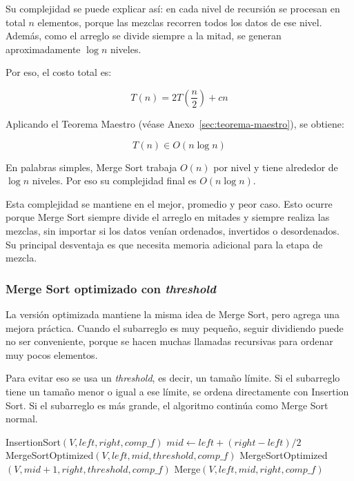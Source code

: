 Su complejidad se puede explicar así: en cada nivel de recursión se procesan en total $n$ elementos, porque las mezclas recorren todos los datos de ese nivel. Además, como el arreglo se divide siempre a la mitad, se generan aproximadamente $\log n$ niveles.

Por eso, el costo total es:

\[
    T(n)=2T\left(\frac{n}{2}\right)+cn
\]

Aplicando el Teorema Maestro (véase Anexo~\ref{sec:teorema-maestro}), se obtiene:

\[
    T(n) \in O(n \log n)
\]

En palabras simples, Merge Sort trabaja $O(n)$ por nivel y tiene alrededor de $\log n$ niveles. Por eso su complejidad final es $O(n \log n)$.

Esta complejidad se mantiene en el mejor, promedio y peor caso. Esto ocurre porque Merge Sort siempre divide el arreglo en mitades y siempre realiza las mezclas, sin importar si los datos venían ordenados, invertidos o desordenados. Su principal desventaja es que necesita memoria adicional para la etapa de mezcla.

\subsubsection{Merge Sort optimizado con \textit{threshold}}

La versión optimizada mantiene la misma idea de Merge Sort, pero agrega una mejora práctica. Cuando el subarreglo es muy pequeño, seguir dividiendo puede no ser conveniente, porque se hacen muchas llamadas recursivas para ordenar muy pocos elementos.

Para evitar eso se usa un \textit{threshold}, es decir, un tamaño límite. Si el subarreglo tiene un tamaño menor o igual a ese límite, se ordena directamente con Insertion Sort. Si el subarreglo es más grande, el algoritmo continúa como Merge Sort normal.

\begin{algorithm}
    \caption{Merge Sort optimizado con threshold $\triangleright$ $V[left..right]$}
    \label{alg:merge_sort_optimized}
    \begin{algorithmic}[1]
        \State InsertionSort$(V, left, right, comp\_f)$
        \State \Return {}
        \EndIf
        \State \Return {}
        \EndIf
        \State $mid \gets left + (right - left) / 2$
        \State MergeSortOptimized$(V, left, mid, threshold, comp\_f)$ 
        \State MergeSortOptimized$(V, mid + 1, right, threshold, comp\_f)$ 
        \State Merge$(V, left, mid, right, comp\_f)$ 
        \EndProcedure
    \end{algorithmic}
\end{algorithm}


